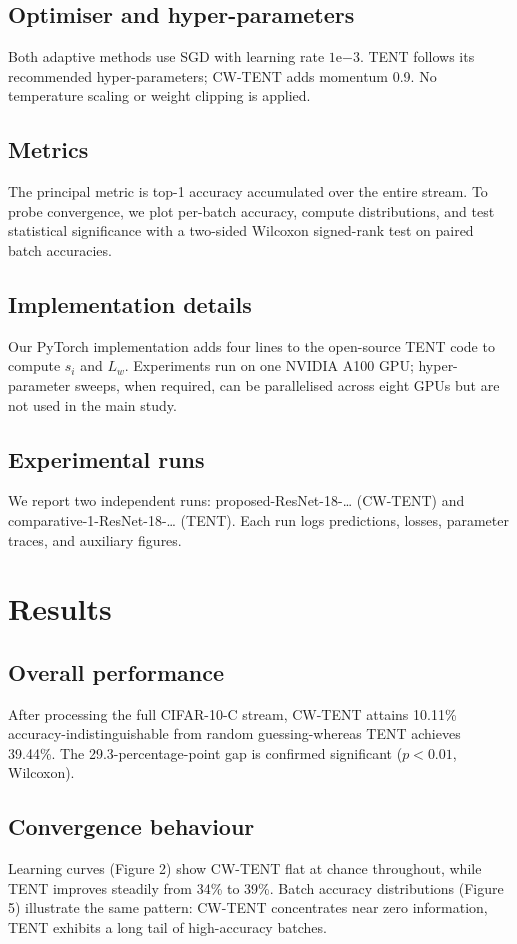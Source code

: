 \documentclass{article} %
\begin{document}
\subsection{Optimiser and hyper-parameters}
Both adaptive methods use SGD with learning rate \(1\mathrm{e}{-3}\). TENT follows its recommended hyper-parameters; CW-TENT adds momentum 0.9. No temperature scaling or weight clipping is applied.

\subsection{Metrics}
The principal metric is top-1 accuracy accumulated over the entire stream. To probe convergence, we plot per-batch accuracy, compute distributions, and test statistical significance with a two-sided Wilcoxon signed-rank test on paired batch accuracies.

\subsection{Implementation details}
Our PyTorch implementation adds four lines to the open-source TENT code to compute \(s_i\) and \(L_w\). Experiments run on one NVIDIA A100 GPU; hyper-parameter sweeps, when required, can be parallelised across eight GPUs but are not used in the main study.

\subsection{Experimental runs}
We report two independent runs: proposed-ResNet-18-\ldots{} (CW-TENT) and comparative-1-ResNet-18-\ldots{} (TENT). Each run logs predictions, losses, parameter traces, and auxiliary figures.

\section{Results}
\label{sec:results}
\subsection{Overall performance}
After processing the full CIFAR-10-C stream, CW-TENT attains 10.11\% accuracy-indistinguishable from random guessing-whereas TENT achieves 39.44\%. The 29.3-percentage-point gap is confirmed significant (\(p < 0.01\), Wilcoxon).

\subsection{Convergence behaviour}
Learning curves (Figure 2) show CW-TENT flat at chance throughout, while TENT improves steadily from 34\% to 39\%. Batch accuracy distributions (Figure 5) illustrate the same pattern: CW-TENT concentrates near zero information, TENT exhibits a long tail of high-accuracy batches.
\end{document}
